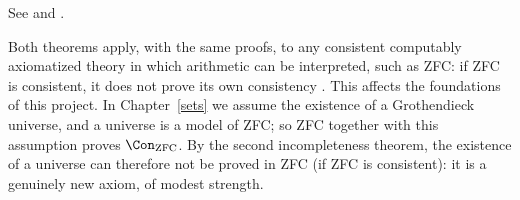 See \cite{godel-1931} and \cite{smith-godel}.

\begin{remark}\label{logic:remark-incompleteness-set-theory}
Both theorems apply, with the same proofs, to any consistent computably
axiomatized theory in which arithmetic can be interpreted, such as ZFC:
if ZFC is consistent, it does not prove its own consistency
\cite{kunen-set-theory}. This affects the foundations of this project. In
Chapter~\ref{sets} we assume the existence of a Grothendieck universe, and a
universe is a model of ZFC; so ZFC together with this assumption proves
$\Con_{\mathrm{ZFC}}$. By the second incompleteness theorem, the existence of
a universe can therefore not be proved in ZFC (if ZFC is consistent): it is a
genuinely new axiom, of modest strength.
\end{remark}

